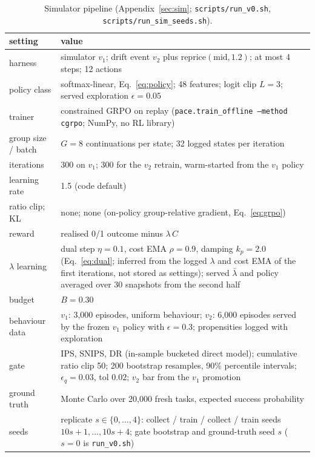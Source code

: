 \documentclass[10pt]{article}
\newcommand{\code}[1]{\texttt{#1}}
\begin{document}
\begin{table}[H]
\centering\footnotesize
\caption{Simulator pipeline (Appendix~\ref{sec:sim}; \code{scripts/run\_v0.sh}, \code{scripts/run\_sim\_seeds.sh}).}
\label{tab:det-sim}
\begin{tabular}{p{4.0cm}p{11.6cm}}
\toprule
setting & value \\
\midrule
harness & simulator $v_1$; drift event $v_2$ plus $\mathrm{reprice}(\text{mid},1.2)$; at most 4 steps; 12 actions \\
policy class & softmax-linear, Eq.~\eqref{eq:policy}; 48 features; logit clip $L=3$; served exploration $\epsilon=0.05$ \\
trainer & constrained GRPO on replay (\code{pace.train\_offline --method cgrpo}; NumPy, no RL library) \\
group size / batch & $G=8$ continuations per state; 32 logged states per iteration \\
iterations & 300 on $v_1$; 300 for the $v_2$ retrain, warm-started from the $v_1$ policy \\
learning rate & 1.5 (code default) \\
ratio clip; KL & none; none (on-policy group-relative gradient, Eq.~\eqref{eq:grpo}) \\
reward & realised 0/1 outcome minus $\lambda\,C$ \\
$\lambda$ learning & dual step $\eta=0.1$, cost EMA $\rho=0.9$, damping $k_p=2.0$ (Eq.~\eqref{eq:dual}; inferred from the logged $\lambda$ and cost EMA of the first iterations, not stored as settings); served $\bar\lambda$ and policy averaged over 30 snapshots from the second half \\
budget & $B=0.30$ \\
behaviour data & $v_1$: 3{,}000 episodes, uniform behaviour; $v_2$: 6{,}000 episodes served by the frozen $v_1$ policy with $\epsilon=0.3$; propensities logged with exploration \\
gate & IPS, SNIPS, DR (in-sample bucketed direct model); cumulative ratio clip 50; 200 bootstrap resamples, 90\% percentile intervals; $\epsilon_q=0.03$, tol $0.02$; $v_2$ bar from the $v_1$ promotion \\
ground truth & Monte Carlo over 20{,}000 fresh tasks, expected success probability \\
seeds & replicate $s\in\{0,\dots,4\}$: collect / train / collect / train seeds $10s{+}1,\dots,10s{+}4$; gate bootstrap and ground-truth seed $s$ ($s=0$ is \code{run\_v0.sh}) \\
\bottomrule
\end{tabular}
\end{table}
\end{document}
